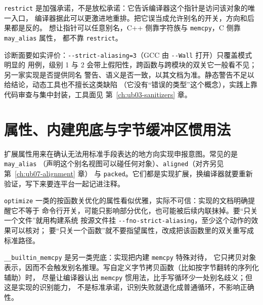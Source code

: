 \documentclass[12pt,a4paper,fontset=fandol]{ctexbook}
\newcommand{\Tp}[1]{\texttt{#1}}
\newcommand{\Opt}[1]{\texttt{-\/-#1}}
\newcommand{\Bk}{\discretionary{}{}{}}
\newcommand{\Lang}[1]{\textsf{#1}}
\newcommand{\CL}{\Lang{C}}
\newcommand{\CPP}{\Lang{C++}}
\newcommand{\Warn}[1]{\texttt{-\/-#1}}
\begin{document}
\begin{note}[title={别把 \Tp{restrict} 当别名开关}]
\Tp{restrict} 是加强承诺，不是放松承诺：它告诉编译器这个指针是访问该对象的唯一入口，
编译器据此可以更激进地重排。把它误当成允许别名的开关，方向和后果都是反的。
想让指针可以任意别名，\CPP{} 侧靠字符族与 \Tp{memcpy}，\CL{} 侧靠 \Tp{may\_alias} 属性，
都不靠 \Tp{restrict}。
\end{note}

诊断面要如实评价：\Warn{strict{\Bk}-aliasing=3}（GCC 由 \Warn{Wall} 打开）只覆盖模式明显的
用例，级别 1 与 2 会带上假阳性，跨函数与跨模块的双关它一般看不见；另一家实现是否提供同名
警告、语义是否一致，以其文档为准。静态警告不足以给结论，动态工具也不擅长这类缺陷
（它没有“错误的类型”这个概念），实践上靠代码审查与集中封装，工具面见 第~\ref{ch:ub03-sanitizers} 章。

\section{属性、内建兜底与字节缓冲区惯用法}\label{sec:ub06-attrs}

扩展属性用来在确认无法用标准手段表达的地方向实现申报意图。常见的是 \Tp{may\_alias}
（声明这个别名视图可以碰任何对象）、\Tp{aligned}（对齐另见 第~\ref{ch:ub07-alignment} 章）
与 \Tp{packed}。它们都是实现扩展，换编译器就要重新验证，写下来要连平台一起记进注释。

\Tp{optimize} 一类的按函数关优化的属性看似优雅，实际不可信：实现的文档明确提醒它不等于
命令行开关，可能只影响部分优化，也可能被后续内联抹掉。要“只关一个文件”就用构建系统
按源文件挂 \Opt{fno{\Bk}-strict{\Bk}-aliasing}，至少这个动作的效果可以核对；
要“只关一个函数”就不要指望属性，改成把该函数里的双关重写成标准路径。

\Tp{\_\_builtin{\Bk}\_memcpy} 是另一类兜底：实现把内建 \Tp{memcpy} 特殊对待，
它只拷贝对象表示，因而不会触发别名推理。写自定义字节拷贝函数（比如按字节翻转的序列化辅助）时，
尽量让编译器认出 \Tp{memcpy} 惯用法，比手写循环少一处别名歧义；但这是实现的识别能力，
不是标准承诺，识别失败就退化成普通循环，不影响正确性。
\end{document}
